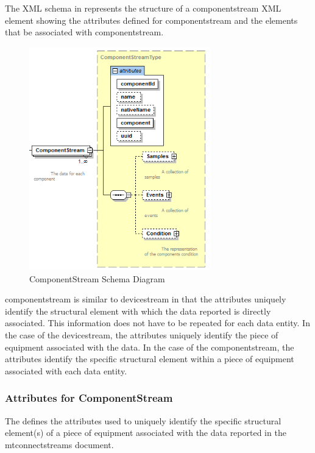 \documentclass{mtconnect}	%
\begin{document}
The XML schema in  represents the structure of a \gls{componentstream} XML element showing the attributes defined for \gls{componentstream} and the elements that \may be associated with \gls{componentstream}.

\begin{figure}[ht]
  \centering
  \includegraphics[width=0.7\textwidth]{figures/componentstream-schema-diagram.png}
  \caption{ComponentStream Schema Diagram}
  \label{fig:componentstream-schema-diagram}
\end{figure}

\FloatBarrier

\gls{componentstream} is similar to \gls{devicestream} in that the attributes uniquely identify the \gls{structural element} with which the data reported is directly associated.  This information does not have to be repeated for each \gls{data entity}.   In the case of the \gls{devicestream}, the attributes uniquely identify the piece of equipment associated with the data.   In the case of the \gls{componentstream}, the attributes identify the specific \gls{structural element} within a piece of equipment associated with each \gls{data entity}.  

\subsubsection{Attributes for ComponentStream}

The  defines the attributes used to uniquely identify the specific \gls{structural element}(s) of a piece of equipment associated with the data reported in the \gls{mtconnectstreams} document.  
\end{document}
